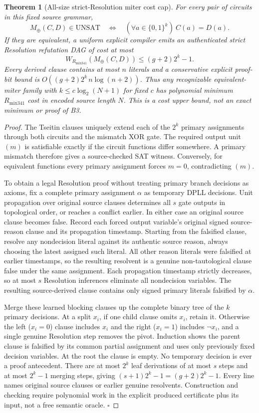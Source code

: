 \documentclass[11pt]{article}
\newtheorem{theorem}{Theorem}
\begin{document}
\begin{theorem}[All-size strict-Resolution miter cost cap]
For every pair of circuits in this fixed source grammar,
\[
M_\oplus(C,D)\in\mathrm{UNSAT}\quad\Longleftrightarrow\quad
(\forall a\in\{0,1\}^k)\ C(a)=D(a).
\]
If they are equivalent, a uniform explicit compiler emits an authenticated strict Resolution refutation DAG of cost at most
\[
\boxed{W_{R_{\mathrm{mix341}}}(M_\oplus(C,D))\le(g+2)2^k-1.}
\]
Every derived clause contains at most $n$ literals and a conservative explicit proof-bit bound is $O((g+2)2^k\,n\log(n+2))$. Thus any recognizable equivalent-miter family with $k\le c\log_2(N+1)$ for fixed $c$ has polynomial minimum $R_{\mathrm{mix341}}$ cost in encoded source length $N$. This is a cost \emph{upper} bound, not an exact minimum or proof of B3.
\end{theorem}
\begin{proof}
The Tseitin clauses uniquely extend each of the $2^k$ primary assignments through both circuits and the mismatch XOR gate. The required output unit $(m)$ is satisfiable exactly if the circuit functions differ somewhere. A primary mismatch therefore gives a source-checked SAT witness. Conversely, for equivalent functions every primary assignment forces $m=0$, contradicting $(m)$.

To obtain a legal Resolution proof without treating primary branch decisions as axioms, fix a complete primary assignment $\alpha$ as temporary DPLL decisions. Unit propagation over original source clauses determines all $s$ gate outputs in topological order, or reaches a conflict earlier. In either case an original source clause becomes false. Record each forced output variable's original signed source-reason clause and its propagation timestamp. Starting from the falsified clause, resolve any nondecision literal against its authentic source reason, always choosing the latest assigned such literal. All other reason literals were falsified at earlier timestamps, so the resulting resolvent is a genuine non-tautological clause false under the same assignment. Each propagation timestamp strictly decreases, so at most $s$ Resolution inferences eliminate all nondecision variables. The resulting source-derived clause contains only signed primary literals falsified by $\alpha$.

Merge these learned blocking clauses up the complete binary tree of the $k$ primary decisions. At a split $x_i$, if one child clause omits $x_i$, retain it. Otherwise the left ($x_i=0$) clause includes $x_i$ and the right ($x_i=1$) includes $\neg x_i$, and a single genuine Resolution step removes the pivot. Induction shows the parent clause is falsified by its common partial assignment and uses only previously fixed decision variables. At the root the clause is empty. No temporary decision is ever a proof antecedent. There are at most $2^k$ leaf derivations of at most $s$ steps and at most $2^k-1$ merging steps, giving $(s+1)2^k-1=(g+2)2^k-1$. Every line names original source clauses or earlier genuine resolvents. Construction and checking require polynomial work in the explicit produced certificate plus its input, not a free semantic oracle. \hfill$\square$
\end{proof}
\end{document}
